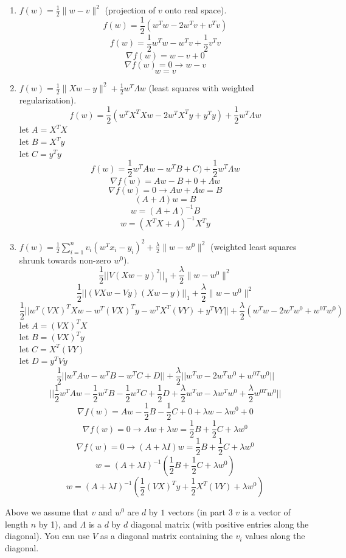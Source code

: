 \documentclass{article}
\def\blu#1{{\color{blu}#1}}
\def\norm#1{\|#1\|}
\def\ans#1{{\color{ans}#1}}
\def\half{\frac 1 2}
\def\enum#1{\begin{enumerate}#1\end{enumerate}}
\begin{document}
\blu{\enum{
\item $f(w) = \half \norm{w-v}^2$ (projection of $v$ onto real space).
\ans{
    \[
        f(w) = \half (w^Tw - 2w^Tv + v^Tv)
    \]
    \[
        f(w) = \half w^Tw - w^Tv + \half v^Tv
    \]
    \[
        \nabla f(w) = w - v + 0
    \]
    \[
        \nabla f(w) = 0 \rightarrow w - v
    \]
    \[
        w = v
    \]
}
\item $f(w)= \half \norm{Xw - y}^2 + \half w^T\Lambda w$ (least squares with weighted regularization).
\ans{
    \[
        f(w) = \half (w^TX^TXw - 2w^TX^Ty + y^Ty) + \half w^T \Lambda w
    \]
    let $A = X^TX$ \\
    let $B = X^Ty$ \\
    let $C = y^Ty$ \\
    \[
        f(w) = \half w^TAw - w^TB + C) + \half w^T \Lambda w
    \]
    \[
        \nabla f(w) = Aw - B + 0 + \Lambda w
    \]
    \[
        \nabla f(w) = 0 \rightarrow Aw + \Lambda w = B
    \]
    \[
        (A + \Lambda )w = B
    \]
    \[
        w = (A + \Lambda )^{-1}B
    \]
    \[
        w = (X^TX + \Lambda)^{-1} X^Ty
    \]
}
\item $f(w) = \half \sum_{i=1}^n v_i (w^Tx_i - y_i)^2 + \frac{\lambda}{2}\norm{w-w^0}^2$ (weighted least squares shrunk towards non-zero $w^0$).
\ans{
    \[
        \half || V (Xw - y)^2 ||_1 + \frac{\lambda}{2}\norm{w-w^0}^2
    \]
    \[
        \half || (VXw - Vy) (Xw - y) ||_1 + \frac{\lambda}{2}\norm{w-w^0}^2
    \]
    \[
        \half || w^T(VX)^TXw - w^T(VX)^Ty - w^TX^T(VY) + y^TVY || + \frac{\lambda}{2}(w^Tw - 2w^Tw^0 + w^{0T}w^0)
    \]
    let $A = (VX)^TX$ \\
    let $B = (VX)^Ty$ \\
    let $C = X^T(VY)$ \\
    let $D = y^TVy$ \\
    \[
        \half || w^TAw - w^TB - w^TC + D || + \frac{\lambda}{2}||w^Tw - 2w^Tw^0 + w^{0T}w^0||
    \]
    \[
        || \half w^TAw - \half w^TB - \half w^TC + \half D + \frac{\lambda}{2} w^Tw - \lambda w^Tw^0 + \frac{\lambda}{2} w^{0T}w^0 ||
    \]
    \[
        \nabla f(w) = Aw - \half B - \half C + 0 + \lambda w - \lambda w^0 + 0
    \]
    \[
        \nabla f(w) = 0 \rightarrow Aw + \lambda w = \half B + \half C + \lambda w^0 
    \]
    \[
        \nabla f(w) = 0 \rightarrow (A + \lambda I) w = \half B + \half C + \lambda w^0 
    \]
    \[
        w = (A + \lambda I)^{-1} (\half B + \half C + \lambda w^0 )
    \]
    \[
        w = (A + \lambda I)^{-1} (\half (VX)^Ty + \half X^T(VY) + \lambda w^0 )
    \]
}
}}
Above we assume that $v$ and $w^0$ are $d$ by $1$ vectors (in part 3 $v$ is a vector of length $n$ by 1), and $\Lambda$ is a $d$ by $d$ diagonal matrix (with positive entries along the diagonal). You can use $V$ as a diagonal matrix containing the $v_i$ values along the diagonal.
\end{document}
